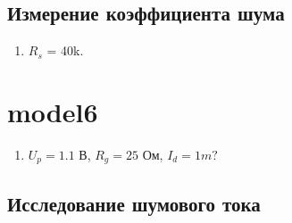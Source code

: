 \documentclass[a4paper, 12pt]{article}%
\begin{document}
\subsection*{Измерение коэффициента шума}

\begin{enumerate}
\item

\FloatBarrier
$R_s$ = 40k.


\end{enumerate}

\section{\textbf{model6}}

\begin{enumerate}

\item

$U_p = 1.1$ В, $R_g = 25$ Ом, $I_d = 1m?$
\FloatBarrier


\end{enumerate}

\subsection*{Исследование шумового тока}
\end{document}
